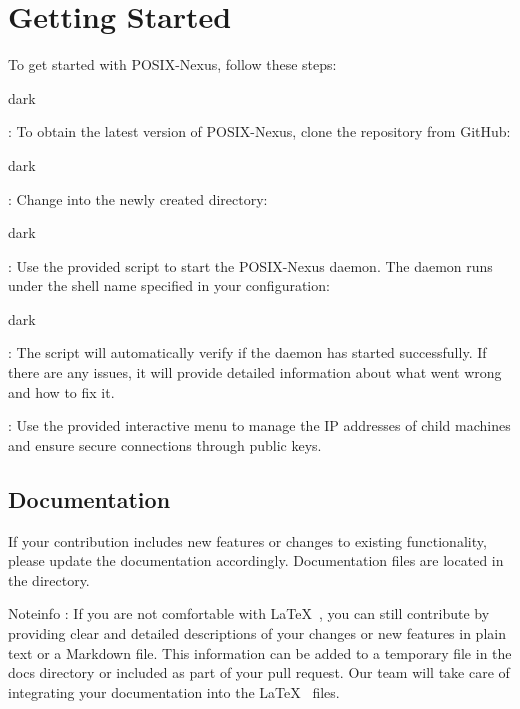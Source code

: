 \section{Getting Started}
\label{sec:start}
To get started with POSIX-Nexus, follow these steps:
\bigskip
\begin{baseBoxOne}{}{dark}
    \begin{posnexItemize}
        \item[\sA] : To obtain the latest version of POSIX-Nexus, clone the repository from GitHub:\smallskip
        \begin{baseBoxThree}{}{dark}
        \end{baseBoxThree}\smallskip
        \item[\sA] : Change into the newly created directory:\smallskip
        \begin{baseBoxThree}{}{dark}\smallskip
        \end{baseBoxThree}\smallskip
        \item[\sA] : Use the provided  script to start the POSIX-Nexus daemon. The daemon runs under the shell name specified in your configuration:\smallskip
        \begin{baseBoxThree}{}{dark}
        \end{baseBoxThree}\smallskip
        \item[\sA] : The script will automatically verify if the daemon has started successfully. If there are any issues, it will provide detailed information about what went wrong and how to fix it.
        \item[\sA] : Use the provided interactive menu to manage the IP addresses of child machines and ensure secure connections through public keys.
    \end{posnexItemize}
\end{baseBoxOne}

\subsection{Documentation}
\label{sec:start:sub:document}
If your contribution includes new features or changes to existing functionality, please update the documentation accordingly.
Documentation files are located in the  directory.
\bigskip
\begin{baseBoxThree}{Note}{info}
    : If you are not comfortable with \LaTeX~, you can still contribute by providing clear and detailed descriptions of your changes or new features in plain text or a Markdown file. This information can be added to a temporary file in the docs directory or included as part of your pull request. Our team will take care of integrating your documentation into the \LaTeX~ files.\smallskip
\end{baseBoxThree}

